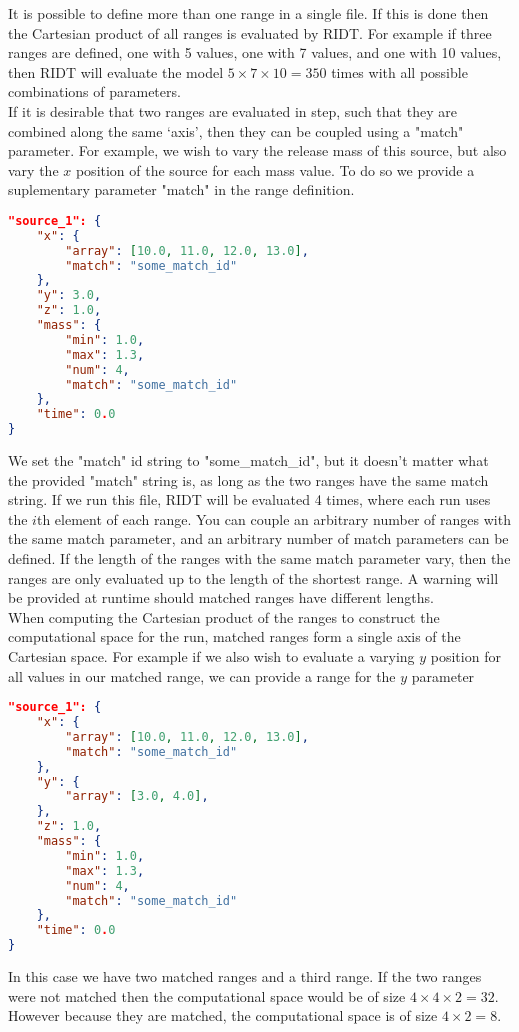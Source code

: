 \documentclass[]{article}
\begin{document}
\noindent It is possible to define more than one range in a single file. If 
this is done then the Cartesian product of all ranges is evaluated by RIDT. For
example if three ranges are defined, one with 5 values, one with 7 values, and
one with 10 values, then RIDT will evaluate the model $5\times7\times10=350$
times with all possible combinations of parameters.\\

\noindent If it is desirable that two ranges are evaluated in step, such that they are
combined along the same `axis', then they can be coupled using a "match"
parameter. For example, we wish to vary the release mass of this source, but
also vary the $x$ position of the source for each mass value. To do so we provide
a suplementary parameter "match" in the range definition.\\
\begin{lstlisting}[language=json,firstnumber=1]
"source_1": {
    "x": {
        "array": [10.0, 11.0, 12.0, 13.0],
        "match": "some_match_id"
    },
    "y": 3.0,
    "z": 1.0,
    "mass": {
        "min": 1.0,
        "max": 1.3,
        "num": 4,
        "match": "some_match_id"
    },
    "time": 0.0
}
\end{lstlisting}
\medskip
We set the "match" id string to "some\_match\_id", but it doesn't matter what the
provided "match" string is, as long as the two ranges have the same match
string. If we run this file, RIDT will be evaluated 4 times, where each run uses
the $i$th element of each range. You can couple an arbitrary number of ranges
with the same match parameter, and an arbitrary number of match parameters can
be defined. If the length of the ranges with the same match parameter vary, then
the ranges are only evaluated up to the length of the shortest range. A warning
will be provided at runtime should matched ranges have different lengths.\\

\noindent When computing the Cartesian product of the ranges to construct the
computational space for the run, matched ranges form a single axis of the
Cartesian space. For example if we also wish to evaluate a varying $y$ position
for all values in our matched range, we can provide a range for the $y$
parameter\\
\begin{lstlisting}[language=json,firstnumber=1]
"source_1": {
    "x": {
        "array": [10.0, 11.0, 12.0, 13.0],
        "match": "some_match_id"
    },
    "y": {
        "array": [3.0, 4.0],
    },
    "z": 1.0,
    "mass": {
        "min": 1.0,
        "max": 1.3,
        "num": 4,
        "match": "some_match_id"
    },
    "time": 0.0
}
\end{lstlisting}
\medskip
In this case we have two matched ranges and a third range. If the two ranges
were not matched then the computational space would be of size
$4\times4\times2=32$. However because they are matched, the computational space 
is of size $4\times2=8$.\\
\end{document}
